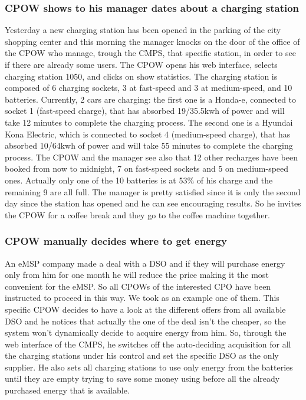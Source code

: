 \documentclass[a4paper]{report}
\begin{document}
\subsubsection{CPOW shows to his manager dates about a charging station}
Yesterday a new charging station has been opened in the parking of the city shopping center and this morning the manager knocks on the door of the office of the CPOW who manage, trough the CMPS, that specific station, in order to see if there are already some users. The CPOW opens his web interface, selects charging station 1050, and clicks on show statistics. The charging station is composed of 6 charging sockets, 3 at fast-speed and 3 at medium-speed, and 10 batteries. Currently, 2 cars are charging: the first one is a Honda-e, connected to socket 1 (fast-speed charge), that has absorbed 19/35.5kwh of power and will take 12 minutes to complete the charging process. The second one is a Hyundai	Kona Electric, which is connected to socket 4 (medium-speed charge), that has absorbed 10/64kwh of power and will take 55 minutes to complete the charging process. The CPOW and the manager see also that 12 other recharges have been booked from now to midnight, 7 on fast-speed sockets and 5 on medium-speed ones. Actually only one of the 10 batteries is at 53\% of his charge and the remaining 9 are all full. The manager is pretty satisfied since it is only the second day since the station has opened and he can see encouraging results. So he invites the CPOW for a coffee break and they go to the coffee machine together.

\subsubsection{CPOW manually decides where to get energy}
An eMSP company made a deal with a DSO and if they will purchase energy only from him for one month he will reduce the price making it the most convenient for the eMSP. So all CPOWs of the interested CPO have been instructed to proceed in this way. We took as an example one of them. This specific CPOW decides to have a look at the different offers from all available DSO and he notices that actually the one of the deal isn't the cheaper, so the system won't dynamically decide to acquire energy from him. So, through the web interface of the
 CMPS, he switches off the auto-deciding acquisition for all the charging stations under his control and set the specific DSO as the only supplier. He also sets all charging stations to use only energy from the batteries until they are empty trying to save some money using before all the already purchased energy that is available. 
\end{document}
